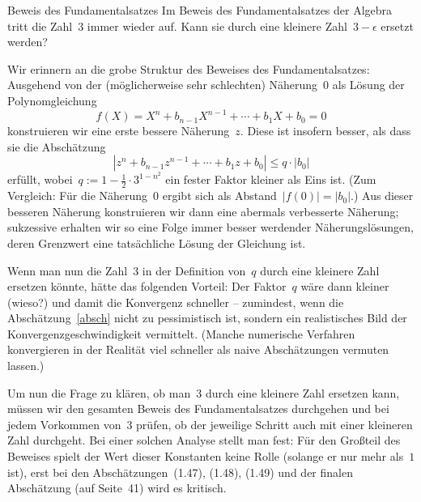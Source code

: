 \documentclass{algblatt}
\begin{document}
\begin{aufgabe}{Beweis des Fundamentalsatzes}
Im Beweis des Fundamentalsatzes der Algebra tritt die Zahl~3 immer wieder auf.
Kann sie durch eine kleinere Zahl~$3-\epsilon$ ersetzt werden?
\begin{loesung}
Wir erinnern an die grobe Struktur des Beweises des Fundamentalsatzes:
Ausgehend von der (möglicherweise sehr schlechten) Näherung~$0$ als Lösung der
Polynomgleichung
\[ f(X) = X^n + b_{n-1}X^{n-1} + \cdots + b_1 X + b_0 = 0 \]
konstruieren wir eine erste bessere Näherung~$z$. Diese ist insofern besser,
als dass sie die Abschätzung
\begin{equation}\label{absch}
  |z^n + b_{n-1}z^{n-1} + \cdots + b_1 z + b_0| \leq q \cdot |b_0|
\end{equation}
erfüllt, wobei~$q := 1 - \frac{1}{2} \cdot 3^{1 - n^2}$ ein fester Faktor
kleiner als Eins ist. (Zum Vergleich: Für die Näherung~$0$ ergibt sich als
Abstand~$|f(0)| = |b_0|$.) Aus dieser besseren Näherung konstruieren wir dann
eine abermals verbesserte Näherung; sukzessive erhalten wir so eine Folge immer
besser werdender Näherungslösungen, deren Grenzwert eine tatsächliche Lösung
der Gleichung ist.

Wenn man nun die Zahl~$3$ in der Definition von~$q$ durch eine kleinere Zahl
ersetzen könnte, hätte das folgenden Vorteil: Der Faktor~$q$ wäre dann kleiner
(wieso?) und damit die Konvergenz schneller -- zumindest, wenn die
Abschätzung~\eqref{absch} nicht zu pessimistisch ist, sondern ein realistisches
Bild der Konvergenzgeschwindigkeit vermittelt. (Manche numerische Verfahren
konvergieren in der Realität viel schneller als naive Abschätzungen vermuten
lassen.)

Um nun die Frage zu klären, ob man~$3$ durch eine kleinere Zahl ersetzen kann,
müssen wir den gesamten Beweis des Fundamentalsatzes durchgehen und bei jedem
Vorkommen von~$3$ prüfen, ob der jeweilige Schritt auch mit einer kleineren
Zahl durchgeht. Bei einer solchen Analyse stellt man fest: Für den Großteil des
Beweises spielt der Wert dieser Konstanten keine Rolle (solange er nur mehr
als~$1$ ist), erst bei den Abschätzungen~(1.47), (1.48), (1.49) und der finalen
Abschätzung (auf Seite~41) wird es kritisch.


\end{loesung}
\end{aufgabe}
\end{document}
